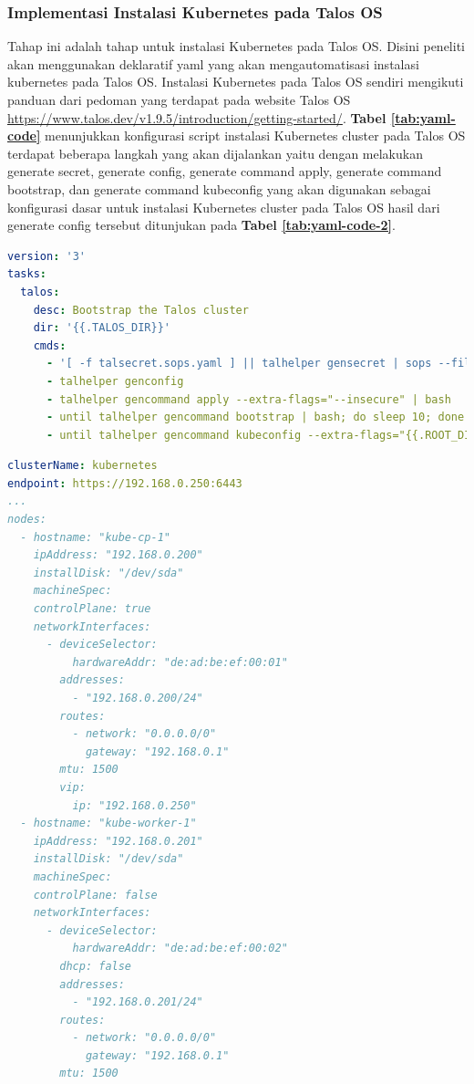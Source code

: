 \subsubsection{Implementasi Instalasi Kubernetes pada Talos OS}
Tahap ini adalah tahap untuk instalasi Kubernetes pada Talos OS. Disini
peneliti akan menggunakan deklaratif yaml yang akan mengautomatisasi instalasi
kubernetes pada Talos OS. Instalasi Kubernetes pada Talos OS sendiri mengikuti
panduan dari pedoman yang terdapat pada website Talos OS
\url{https://www.talos.dev/v1.9.5/introduction/getting-started/}. \textbf{Tabel
  \ref{tab:yaml-code}} menunjukkan konfigurasi script instalasi Kubernetes
cluster pada Talos OS terdapat beberapa langkah yang akan dijalankan yaitu
dengan melakukan generate secret, generate config, generate command apply,
generate command bootstrap, dan generate command kubeconfig yang akan digunakan
sebagai konfigurasi dasar untuk instalasi Kubernetes cluster pada Talos OS
hasil dari generate config tersebut ditunjukan pada \textbf{Tabel
  \ref{tab:yaml-code-2}}.

\begin{table}[!htbp]
  \begin{lstlisting}[language=yaml, basicstyle=\footnotesize\ttfamily]
version: '3'
tasks:
  talos:
    desc: Bootstrap the Talos cluster
    dir: '{{.TALOS_DIR}}'
    cmds:
      - '[ -f talsecret.sops.yaml ] || talhelper gensecret | sops --filename-override talos/talsecret.sops.yaml --encrypt /dev/stdin > talsecret.sops.yaml'
      - talhelper genconfig
      - talhelper gencommand apply --extra-flags="--insecure" | bash
      - until talhelper gencommand bootstrap | bash; do sleep 10; done
      - until talhelper gencommand kubeconfig --extra-flags="{{.ROOT_DIR}} --force" | bash; do sleep 10; done
\end{lstlisting}
  \caption{Konfigurasi script instalasi Kubernetes cluster pada Talos OS}
  \label{tab:yaml-code}
\end{table}
\begin{table}[!htbp]
  \begin{lstlisting}[language=yaml, basicstyle=\footnotesize\ttfamily]
clusterName: kubernetes
endpoint: https://192.168.0.250:6443
...
nodes:
  - hostname: "kube-cp-1"
    ipAddress: "192.168.0.200"
    installDisk: "/dev/sda"
    machineSpec:
    controlPlane: true
    networkInterfaces:
      - deviceSelector:
          hardwareAddr: "de:ad:be:ef:00:01"
        addresses:
          - "192.168.0.200/24"
        routes:
          - network: "0.0.0.0/0"
            gateway: "192.168.0.1"
        mtu: 1500
        vip:
          ip: "192.168.0.250"
  - hostname: "kube-worker-1"
    ipAddress: "192.168.0.201"
    installDisk: "/dev/sda"
    machineSpec:
    controlPlane: false
    networkInterfaces:
      - deviceSelector:
          hardwareAddr: "de:ad:be:ef:00:02"
        dhcp: false
        addresses:
          - "192.168.0.201/24"
        routes:
          - network: "0.0.0.0/0"
            gateway: "192.168.0.1"
        mtu: 1500
\end{lstlisting}
  \caption{Konfigurasi script instalasi Kubernetes cluster pada Talos OS}
  \label{tab:yaml-code-2}
\end{table}
\newpage

